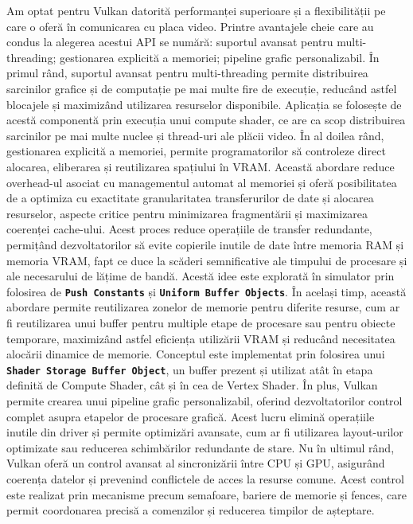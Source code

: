 Am optat pentru Vulkan datorită performanței superioare și a flexibilității pe care o oferă în comunicarea cu placa video. Printre avantajele cheie care au condus la alegerea acestui API se numără: suportul avansat pentru multi-threading; gestionarea explicită a memoriei; pipeline grafic personalizabil. În primul rând, suportul avansat pentru multi-threading permite distribuirea sarcinilor grafice și de computație pe mai multe fire de execuție, reducând astfel blocajele și maximizând utilizarea resurselor disponibile. Aplicația se folosește de acestă componentă prin execuția unui compute shader, ce are ca scop distribuirea sarcinilor pe mai multe nuclee și thread-uri ale plăcii video. În al doilea rând, gestionarea explicită a memoriei, permite programatorilor să controleze direct alocarea, eliberarea și reutilizarea spațiului în VRAM. Această abordare reduce overhead-ul asociat cu managementul automat al memoriei și oferă posibilitatea de a optimiza cu exactitate granularitatea transferurilor de date și alocarea resurselor, aspecte critice pentru minimizarea fragmentării și maximizarea coerenței cache-ului. Acest proces reduce operațiile de transfer redundante, permițând dezvoltatorilor să evite copierile inutile de date între memoria RAM și memoria VRAM, fapt ce duce la scăderi semnificative ale timpului de procesare și ale necesarului de lățime de bandă. Acestă idee este explorată în simulator prin folosirea de \textbf{\texttt{Push Constants}} și \textbf{\texttt{Uniform Buffer Objects}}. În același timp, această abordare permite reutilizarea zonelor de memorie pentru diferite resurse, cum ar fi reutilizarea unui buffer pentru multiple etape de procesare sau pentru obiecte temporare, maximizând astfel eficiența utilizării VRAM și reducând necesitatea alocării dinamice de memorie. Conceptul este implementat prin folosirea unui \textbf{\texttt{Shader Storage Buffer Object}}, un buffer prezent și utilizat atât în etapa definită de Compute Shader, cât și în cea de Vertex Shader. În plus, Vulkan permite crearea unui pipeline grafic personalizabil, oferind dezvoltatorilor control complet asupra etapelor de procesare grafică. Acest lucru elimină operațiile inutile din driver și permite optimizări avansate, cum ar fi utilizarea layout-urilor optimizate sau reducerea schimbărilor redundante de stare. Nu în ultimul rând, Vulkan oferă un control avansat al sincronizării între CPU și GPU, asigurând coerența datelor și prevenind conflictele de acces la resurse comune. Acest control este realizat prin mecanisme precum semafoare, bariere de memorie și fences, care permit coordonarea precisă a comenzilor și reducerea timpilor de așteptare.

